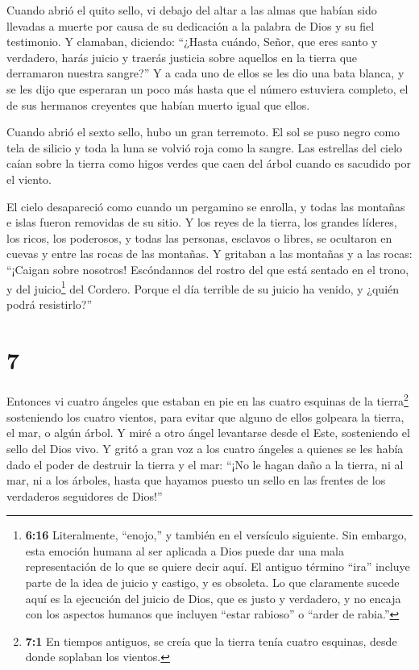  Cuando abrió el quito sello, vi debajo del altar a las
almas que habían sido llevadas a muerte por causa de su dedicación a la
palabra de Dios y su fiel testimonio.  Y clamaban,
diciendo: ``¿Hasta cuándo, Señor, que eres santo y verdadero, harás
juicio y traerás justicia sobre aquellos en la tierra que derramaron
nuestra sangre?''  Y a cada uno de ellos se les dio una
bata blanca, y se les dijo que esperaran un poco más hasta que el número
estuviera completo, el de sus hermanos creyentes que habían muerto igual
que ellos.

 Cuando abrió el sexto sello, hubo un gran terremoto. El
sol se puso negro como tela de silicio y toda la luna se volvió roja
como la sangre.  Las estrellas del cielo caían sobre la
tierra como higos verdes que caen del árbol cuando es sacudido por el
viento.

 El cielo desapareció como cuando un pergamino se enrolla,
y todas las montañas e islas fueron removidas de su sitio. 
Y los reyes de la tierra, los grandes líderes, los ricos, los poderosos,
y todas las personas, esclavos o libres, se ocultaron en cuevas y entre
las rocas de las montañas.  Y gritaban a las montañas y a
las rocas: ``¡Caigan sobre nosotros! Escóndannos del rostro del que está
sentado en el trono, y del juicio\footnote{\textbf{6:16} Literalmente,
  ``enojo,'' y también en el versículo siguiente. Sin embargo, esta
  emoción humana al ser aplicada a Dios puede dar una mala
  representación de lo que se quiere decir aquí. El antiguo término
  ``ira'' incluye parte de la idea de juicio y castigo, y es obsoleta.
  Lo que claramente sucede aquí es la ejecución del juicio de Dios, que
  es justo y verdadero, y no encaja con los aspectos humanos que
  incluyen ``estar rabioso'' o ``arder de rabia.''} del Cordero.
 Porque el día terrible de su juicio ha venido, y ¿quién
podrá resistirlo?''

\hypertarget{section-6}{%
\section{7}\label{section-6}}

 Entonces vi cuatro ángeles que estaban en pie en las cuatro
esquinas de la tierra\footnote{\textbf{7:1} En tiempos antiguos, se
  creía que la tierra tenía cuatro esquinas, desde donde soplaban los
  vientos.} sosteniendo los cuatro vientos, para evitar que alguno de
ellos golpeara la tierra, el mar, o algún árbol.  Y miré a
otro ángel levantarse desde el Este, sosteniendo el sello del Dios vivo.
Y gritó a gran voz a los cuatro ángeles a quienes se les había dado el
poder de destruir la tierra y el mar:  ``¡No le hagan daño a
la tierra, ni al mar, ni a los árboles, hasta que hayamos puesto un
sello en las frentes de los verdaderos seguidores de Dios!''

